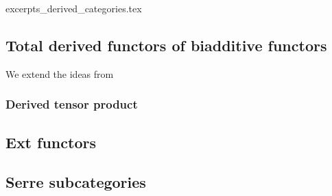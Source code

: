{excerpts_derived_categories.tex}













\subsection{Total derived functors of biadditive functors}

We extend the ideas from 






\subsubsection{Derived tensor product}








\subsection{Ext functors}

\subsection{Serre subcategories}








